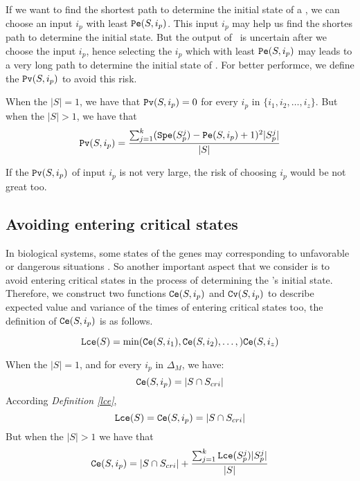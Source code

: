 If we want to find the shortest path to determine the initial state of a \BCN, we can choose an input $i_p$ with least ${\tt Pe}(S, i_p)$. This input $i_p$ may help us find the shortes path to determine the initial state. But the output of \BCNs\ is uncertain after we choose the input $i_p$, hence selecting the $i_p$ which with least ${\tt Pe}(S, i_p)$ may leads to a very long path to determine the initial state of \BCNs. For better performce, we define the $\Pv(S, i_p)$ to avoid this risk.%
\begin{definition}[$\Pv(S, i_p)$] 
When the $|S|=1$, we have that
${\tt Pv}(S, i_p)=0$  for every $i_p$ in $\{i_1,i_2,\ldots, i_z\}$. But when the $|S|>1$, 
we have that  
\[{\tt Pv}(S, i_p)=\frac{\sum_{j=1}^k ({\tt Spe}(S_p^j)-{\tt Pe}(S, i_p)+1)^2 |S_p^j|}{ |S|}\] 
\end{definition}

If the $\Pv(S, i_p)$ of input $i_p$ is not very large, the risk of choosing $i_p$ would be not great too.
\subsection{Avoiding entering critical states}
In biological systems, some states of the genes may corresponding to unfavorable or dangerous situations \cite{Li2014Controllability}. So another important aspect that we consider is to avoid entering critical states in the process of determining the \BCN's initial state. Therefore, we construct two functions $\Ce(S, i_p)$ and ${\tt Cv}(S, i_p)$ to describe expected value and variance of the times of entering critical states too, the definition of $\Ce(S, i_p)$ is as follows.\\
\begin{definition}[$\Lce(S)$] \label{lce}
\[{\tt Lce}(S)= \min({\tt Ce}(S, i_1),{\tt Ce}(S, i_2),\ldots,){\tt Ce}(S, i_z)\]
\end{definition}
\begin{definition}[$\Ce(S, i_p)$] 
When the $|S|=1$, and for every $i_p$ in $\Delta_M$, we have: \[{\tt Ce}(S, i_p)=|S \cap S_{cri} |\] 
According {\em Definition \ref{lce}}, %
\[{\tt Lce}(S)={\tt Ce}(S, i_p)=|S \cap S_{cri} |\] 
But when the $|S|>1$ 
we have that 
\[{\tt Ce}(S, i_p)=|S \cap S_{cri}| +\frac{\sum_{j=1}^k {\tt Lce}(S_p^j)|S_p^j|}{ |S|} \] 
\end{definition}

